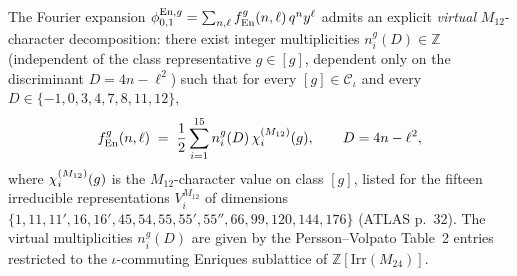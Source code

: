 \begin{theorem}
The Fourier expansion
$\phi^{\mathrm{En},g}_{0,1} = \sum_{n,\ell}f^g_{\mathrm{En}}(n,\ell)\,q^n y^\ell$ admits an
explicit \emph{virtual} $M_{12}$-character decomposition: there exist
integer multiplicities $n^g_i(D)\in\mathbb{Z}$ (independent of the class
representative $g\in [g]$, dependent only on the discriminant
$D = 4n - \ell^2$) such that for every $[g]\in\mathcal{C}_\iota$ and
every $D\in\{-1,0,3,4,7,8,11,12\}$,
\begin{equation}
 f^g_{\mathrm{En}}(n, \ell)
 \;=\;
 \frac{1}{2}\sum_{i=1}^{15} n^g_i(D)\,\chi^{(M_{12})}_{i}(g),
 \qquad D = 4n - \ell^2,
 \label{eq:bkm-enriques-m12-virtual}
\end{equation}
where $\chi^{(M_{12})}_{i}(g)$ is the $M_{12}$-character value on class $[g]$,
listed for the fifteen irreducible representations
$V^{M_{12}}_i$ of dimensions $\{1, 11, 11', 16, 16', 45, 54, 55, 55',
55'', 66, 99, 120, 144, 176\}$ (ATLAS p.~32). The virtual multiplicities
$n^g_i(D)$ are given by the Persson--Volpato Table~2 entries restricted
to the $\iota$-commuting Enriques sublattice of
$\mathbb{Z}[\mathrm{Irr}(M_{24})]$.


\end{theorem}
